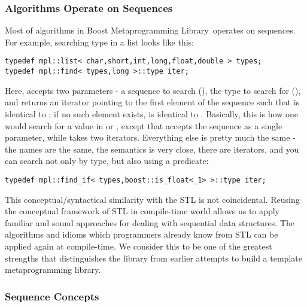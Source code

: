 \documentclass{kapproc}
\newcommand{\Mpl}{Boost Meta\-pro\-gram\-ming Library}
\begin{document}
\subsubsection{Algorithms Operate on Sequences}
  
Most of algorithms in \Mpl\ operates on sequences. For example, 
searching type in a list looks like this:

{\small
\begin{codesamp}\begin{verbatim}
typedef mpl::list< char,short,int,long,float,double > types;
typedef mpl::find< types,long >::type iter;
\end{verbatim}
\end{codesamp}
}

Here,  accepts two parameters - a sequence to search
(), the type to search for (), and returns an
iterator  pointing to the first element of the sequence
such that  is identical to ; if no such
element exists,  is identical to
. Basically, this is how one would search for a
value in  or , except that
 accepts the sequence as a single parameter,
while  takes two iterators.  Everything else is pretty
much the same - the names are the same, the semantics is very close,
there are iterators, and you can search not only by type, but also
using a predicate:

{\small
\begin{codesamp}\begin{verbatim}
typedef mpl::find_if< types,boost::is_float<_1> >::type iter;
\end{verbatim}
\end{codesamp}
}

This conceptual/syntactical similarity with the STL is not
coincidental. Reusing the conceptual framework of STL in compile-time
world allows us to apply familiar and sound approaches for dealing
with sequential data structures. The algorithms and idioms which
programmers already know from STL can be applied again at
compile-time. We consider this to be one of the greatest strengths
that distinguishes the library from earlier attempts to build a
template metaprogramming library.

\subsubsection{Sequence Concepts}
\end{document}
